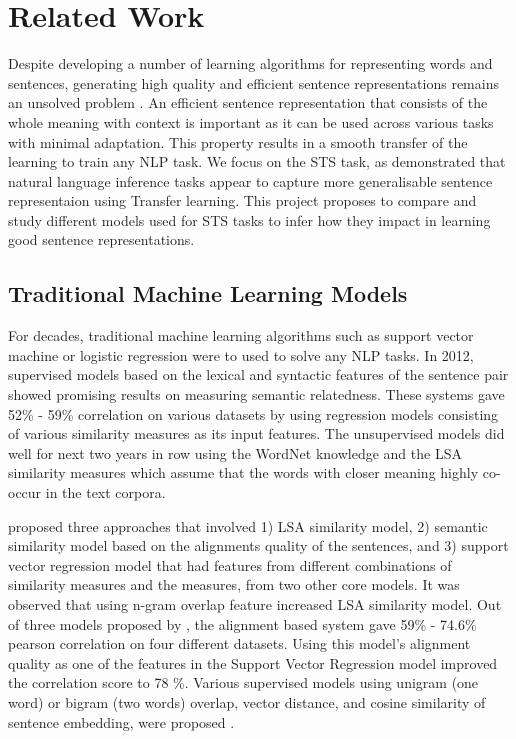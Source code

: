 \documentclass[12pt]{report} %
\begin{document}
\chapter{Related Work}


Despite developing a number of learning algorithms for representing words and sentences, generating high quality and efficient sentence representations remains an unsolved problem \citep{conneau2017supervised}. An efficient sentence representation that consists of the whole meaning with context is important as it can be used across various tasks with minimal adaptation. This property results in a smooth transfer of the learning to train any NLP task. We focus on the STS task, as \cite{conneau2017supervised} demonstrated that natural language inference tasks appear to capture more generalisable sentence representaion using Transfer learning. This project proposes to compare and study different models used for STS tasks to infer how they impact in learning good sentence representations.

\section{Traditional Machine Learning Models}

For decades, traditional machine learning algorithms such as support vector machine or logistic regression were to used to solve any NLP tasks. In 2012, supervised models based on the lexical and syntactic features of the sentence pair showed promising results on measuring semantic relatedness. These systems gave 52\% - 59\% correlation on various datasets by using regression models consisting of various similarity measures as its input features. The unsupervised models did well for next two years in row using the WordNet knowledge and the LSA similarity measures which assume that the words with closer meaning highly co-occur in the text corpora. 

\cite{han2013umbc_ebiquity} proposed three approaches that involved 1) LSA similarity model, 2) semantic similarity model based on the alignments quality of the sentences, and 3) support vector regression model that had features from different combinations of similarity measures and the measures, from two other core models. It was observed that using n-gram overlap feature increased LSA similarity model. Out of three models proposed by \cite{han2013umbc_ebiquity}, the alignment based system gave 59\% - 74.6\% pearson correlation on four different datasets. Using this model's alignment quality as one of the features in the Support Vector Regression model improved the correlation score to 78 \%.  Various supervised models using unigram (one word) or bigram (two words) overlap, vector distance, and cosine similarity of sentence embedding, were proposed \citep{agirre2015semeval}.   
\end{document}
